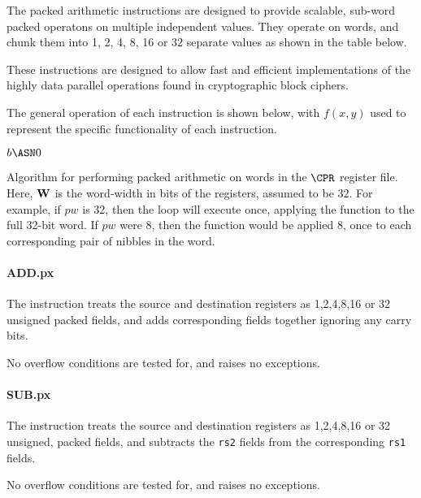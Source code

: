 The packed arithmetic instructions are designed to provide scalable, sub-word
packed operatons on multiple independent values. They operate on words, and
chunk them into 1, 2, 4, 8, 16 or 32 separate values as shown in the table
below.

These instructions are designed to allow fast and efficient implementations
of the highly data parallel operations found in cryptographic block ciphers.

The general operation of each instruction is shown below, with $f(x,y)$
used to represent the specific functionality of each instruction.

\medskip

\begin{algorithm}[H]
    $b   \ASN 0 $\;
\caption{Algorithm for performing packed arithmetic on words in the 
$\CPR$ register file. Here, ${\bf W}$ is the word-width in bits of the
registers, assumed to be $32$. For example, if $pw$ is 32, then the loop
will execute once, applying the function to the full 32-bit word. If $pw$
were $8$, then the function would be applied $8$, once to each corresponding
pair of nibbles in the word.}
\end{algorithm}

\paragraph{ADD.px}

The instruction  treats the source and destination registers as
1,2,4,8,16 or 32 unsigned packed fields, and adds corresponding fields
together ignoring any carry bits.

No overflow conditions are tested for, and  raises no exceptions.

\paragraph{SUB.px}

The instruction  treats the source and destination registers as
1,2,4,8,16 or 32 unsigned, packed fields, and subtracts the {\tt rs2} fields
from the corresponding {\tt rs1} fields.

No overflow conditions are tested for, and  raises no exceptions.

